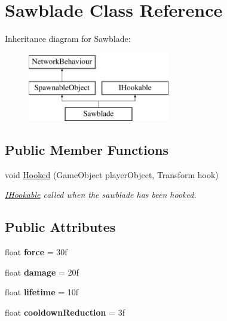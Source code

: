 \hypertarget{class_sawblade}{}\section{Sawblade Class Reference}
\label{class_sawblade}
Inheritance diagram for Sawblade\+:\begin{figure}[H]
\begin{center}
\leavevmode
\includegraphics[height=3.000000cm]{class_sawblade}
\end{center}
\end{figure}
\subsection*{Public Member Functions}
\begin{DoxyCompactItemize}
\item 
void \hyperlink{class_sawblade_a38819b3411e1492b0eeb19ffcaf1dfb1}{Hooked} (Game\+Object player\+Object, Transform hook)
\begin{DoxyCompactList}\small\item\em \hyperlink{interface_i_hookable}{I\+Hookable} called when the sawblade has been hooked. \end{DoxyCompactList}\end{DoxyCompactItemize}
\subsection*{Public Attributes}
\begin{DoxyCompactItemize}
\item 
\hypertarget{class_sawblade_ac1129b43f12b1488bcdd54a2e17985c2}{}\label{class_sawblade_ac1129b43f12b1488bcdd54a2e17985c2} 
float {\bfseries force} = 30f
\item 
\hypertarget{class_sawblade_a72bfecf7cea2c42751c5c160fc05e203}{}\label{class_sawblade_a72bfecf7cea2c42751c5c160fc05e203} 
float {\bfseries damage} = 20f
\item 
\hypertarget{class_sawblade_a458a9029a194bba6fa18d49af6362f45}{}\label{class_sawblade_a458a9029a194bba6fa18d49af6362f45} 
float {\bfseries lifetime} = 10f
\item 
\hypertarget{class_sawblade_a50d3a72be04390deefe05de743c3131f}{}\label{class_sawblade_a50d3a72be04390deefe05de743c3131f} 
float {\bfseries cooldown\+Reduction} = 3f
\end{DoxyCompactItemize}
